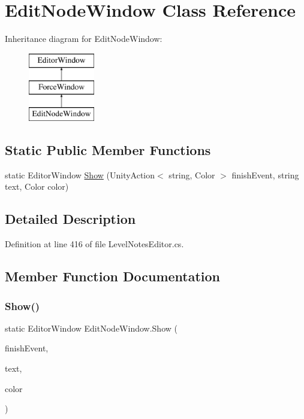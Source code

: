 \hypertarget{class_edit_node_window}{}\section{Edit\+Node\+Window Class Reference}
\label{class_edit_node_window}
Inheritance diagram for Edit\+Node\+Window\+:\begin{figure}[H]
\begin{center}
\leavevmode
\includegraphics[height=3.000000cm]{class_edit_node_window}
\end{center}
\end{figure}
\subsection*{Static Public Member Functions}
\begin{DoxyCompactItemize}
\item 
static Editor\+Window \mbox{\hyperlink{class_edit_node_window_a34740a3d3e4e581f3db2c968f8b7db1a}{Show}} (Unity\+Action$<$ string, Color $>$ finish\+Event, string text, Color color)
\end{DoxyCompactItemize}


\subsection{Detailed Description}


Definition at line 416 of file Level\+Notes\+Editor.\+cs.



\subsection{Member Function Documentation}
\mbox{\label{class_edit_node_window_a34740a3d3e4e581f3db2c968f8b7db1a}} 
\subsubsection{\texorpdfstring{Show()}{Show()}}
{\footnotesize\ttfamily static Editor\+Window Edit\+Node\+Window.\+Show (\begin{DoxyParamCaption}\item[{Unity\+Action$<$ string, Color $>$}]{finish\+Event,  }\item[{string}]{text,  }\item[{Color}]{color }\end{DoxyParamCaption})\hspace{0.3cm}{\ttfamily [static]}}



